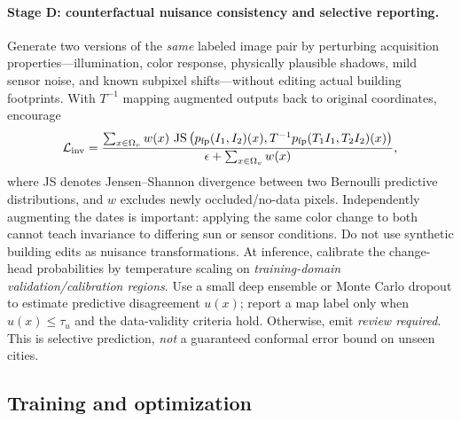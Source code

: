 \documentclass[11pt,a4paper]{article}
\begin{document}
\paragraph{Stage D: counterfactual nuisance consistency and selective reporting.} Generate two versions of the \emph{same} labeled image pair by perturbing acquisition properties---illumination, color response, physically plausible shadows, mild sensor noise, and known subpixel shifts---without editing actual building footprints. With $T^{-1}$ mapping augmented outputs back to original coordinates, encourage
\begin{equation}
 {\cal L}_{\rm inv}=\frac{\sum_{x\in\Omega_v}w(x)\,
  \operatorname{JS}\big(p_{\rm fp}(I_1,I_2)(x),
    T^{-1}p_{\rm fp}(T_1I_1,T_2I_2)(x)\big)}
 {\epsilon+\sum_{x\in\Omega_v}w(x)},
 \label{eq:invariance}
\end{equation}
where JS denotes Jensen--Shannon divergence between two Bernoulli predictive distributions, and $w$ excludes newly occluded/no-data pixels. Independently augmenting the dates is important: applying the same color change to both cannot teach invariance to differing sun or sensor conditions. Do not use synthetic building edits as nuisance transformations. At inference, calibrate the change-head probabilities by temperature scaling on \emph{training-domain validation/calibration regions}. Use a small deep ensemble or Monte Carlo dropout to estimate predictive disagreement $u(x)$; report a map label only when $u(x)\leq\tau_u$ and the data-validity criteria hold. Otherwise, emit \emph{review required}. This is selective prediction, \emph{not} a guaranteed conformal error bound on unseen cities.

\subsection{Training and optimization}
\end{document}

